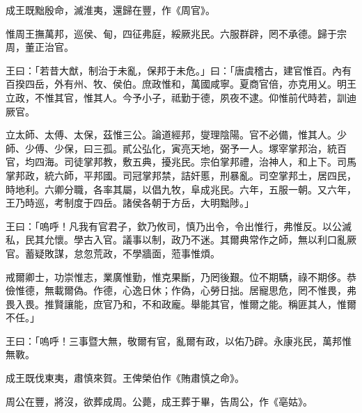 
\begin{pinyinscope}
成王既黜殷命，滅淮夷，還歸在豐，作《周官》。

惟周王撫萬邦，巡侯、甸，四征弗庭，綏厥兆民。六服群辟，罔不承德。歸于宗周，董正治官。

王曰：「若昔大猷，制治于未亂，保邦于未危。」曰：「唐虞稽古，建官惟百。內有百揆四岳，外有州、牧、侯伯。庶政惟和，萬國咸寧。夏商官倍，亦克用乂。明王立政，不惟其官，惟其人。今予小子，祗勤于德，夙夜不逮。仰惟前代時若，訓迪厥官。

立太師、太傅、太保，茲惟三公。論道經邦，燮理陰陽。官不必備，惟其人。少師、少傅、少保，曰三孤。貳公弘化，寅亮天地，弼予一人。塚宰掌邦治，統百官，均四海。司徒掌邦教，敷五典，擾兆民。宗伯掌邦禮，治神人，和上下。司馬掌邦政，統六師，平邦國。司冠掌邦禁，詰奸慝，刑暴亂。司空掌邦土，居四民，時地利。六卿分職，各率其屬，以倡九牧，阜成兆民。六年，五服一朝。又六年，王乃時巡，考制度于四岳。諸侯各朝于方岳，大明黜陟。」

王曰：「嗚呼！凡我有官君子，欽乃攸司，慎乃出令，令出惟行，弗惟反。以公滅私，民其允懷。學古入官。議事以制，政乃不迷。其爾典常作之師，無以利口亂厥官。蓄疑敗謀，怠忽荒政，不學牆面，蒞事惟煩。

戒爾卿士，功崇惟志，業廣惟勤，惟克果斷，乃罔後艱。位不期驕，祿不期侈。恭儉惟德，無載爾偽。作德，心逸日休；作偽，心勞日拙。居寵思危，罔不惟畏，弗畏入畏。推賢讓能，庶官乃和，不和政龐。舉能其官，惟爾之能。稱匪其人，惟爾不任。」

王曰：「嗚呼！三事暨大無，敬爾有官，亂爾有政，以佑乃辟。永康兆民，萬邦惟無斁。

成王既伐東夷，肅慎來賀。王俾榮伯作《賄肅慎之命》。

周公在豐，將沒，欲葬成周。公薨，成王葬于畢，告周公，作《亳姑》。


\end{pinyinscope}
